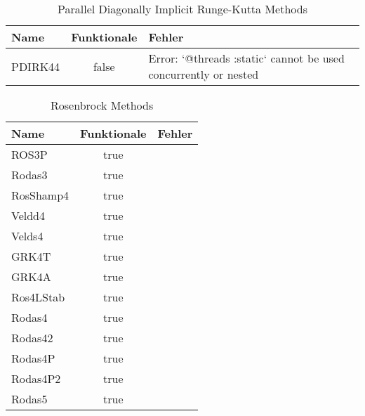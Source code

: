\begin{table}[]
    \centering

    \begin{tabular}{p{5cm}|c|p{5cm}}
        Name & Funktionale & Fehler \\
        \hline\hline
        PDIRK44 & false & Error: `@threads :static` cannot be used concurrently or nested \\
    \end{tabular}
    \caption{Parallel Diagonally Implicit Runge-Kutta Methods}
    \label{tab:my_label}
\end{table}

\begin{table}[]
    \centering

    \begin{tabular}{p{5cm}|c|p{5cm}}
        Name & Funktionale & Fehler \\
        \hline\hline
        ROS3P     & true & \\ 
        Rodas3    & true & \\ 
        RosShamp4 & true & \\ 
        Veldd4    & true & \\ 
        Velds4    & true & \\ 
        GRK4T     & true & \\ 
        GRK4A     & true & \\ 
        Ros4LStab & true & \\ 
        Rodas4    & true & \\ 
        Rodas42   & true & \\ 
        Rodas4P   & true & \\ 
        Rodas4P2  & true & \\ 
        Rodas5    & true & \\ 
    \end{tabular}
    \caption{Rosenbrock Methods}
    \label{tab:my_label}
\end{table}

